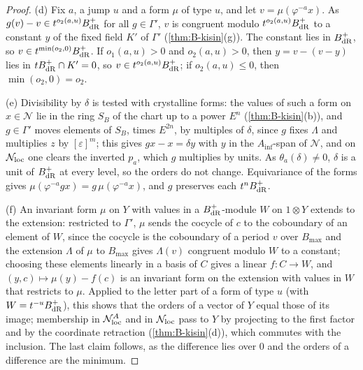 \begin{proof}
(d) Fix $a$, a jump $u$ and a form $\mu$ of type $u$, and let $v=\mu(\varphi^{-a}x)$. As $g(v)-v\in t^{o_2(a,u)}B_{\rm dR}^+$ for all $g\in\Gamma'$, $v$ is congruent modulo $t^{o_2(a,u)}B_{\rm dR}^+$ to a constant $y$ of the fixed field $K'$ of $\Gamma'$ (\cref{thm:B-kisin}(g)). The constant lies in $B_{\rm dR}^+$, so $v\in t^{\min(o_2,0)}B_{\rm dR}^+$. If $o_1(a,u)>0$ and $o_2(a,u)>0$, then $y=v-(v-y)$ lies in $tB_{\rm dR}^+\cap K'=0$, so $v\in t^{o_2(a,u)}B_{\rm dR}^+$; if $o_2(a,u)\le0$, then $\min(o_2,0)=o_2$.

(e) Divisibility by $\delta$ is tested with crystalline forms: the values of such a form on $x\in\mathcal N$ lie in the ring $S_B$ of the chart up to a power $E^n$ (\cref{thm:B-kisin}(b)), and $g\in\Gamma'$ moves elements of $S_B$, times $E^{2n}$, by multiples of $\delta$, since $g$ fixes $\Lambda$ and
multiplies $z$ by $[\varepsilon]^m$; this gives $gx-x=\delta y$ with $y$ in the $A_{\inf}$-span of $\mathcal N$, and on $\mathcal N_{\rm loc}$ one clears the inverted $p_a$, which $g$ multiplies by units. As $\theta_a(\delta)\neq0$, $\delta$ is a unit of $B_{\rm dR}^+$ at every level, so the orders do
not change. Equivariance of the forms gives $\mu(\varphi^{-a}gx)=g\,\mu(\varphi^{-a}x)$, and $g$ preserves each $t^nB_{\rm dR}^+$.

(f) An invariant form $\mu$ on $Y$ with values in a $B_{\rm dR}^+$-module $W$ on $1\otimes Y$ extends to the extension: restricted to $\Gamma'$, $\mu$ sends the cocycle of $c$ to the coboundary of an element of $W$, since the cocycle is the coboundary of a period $v$ over $B_{\max}$ and the extension $\Lambda$ of $\mu$ to
$B_{\max}$ gives $\Lambda(v)$ congruent modulo $W$ to a constant; choosing these elements linearly in a basis of $C$ gives a linear $f\colon C\to W$, and $(y,c)\mapsto\mu(y)-f(c)$ is an invariant form on the extension with values in $W$ that restricts to $\mu$. Applied to the letter part of a form of type $u$ (with
$W=t^{-u}B_{\rm dR}^+$), this shows that the orders of a vector of $Y$ equal those of its image; membership in $\mathcal N^A_{\rm loc}$ and in $\mathcal N_{\rm loc}$ pass to $Y$ by projecting to the first factor and by the coordinate retraction (\cref{thm:B-kisin}(d)), which commutes with the
inclusion. The last claim follows, as the difference lies over $0$ and the orders of a difference are the minimum.
\end{proof}

